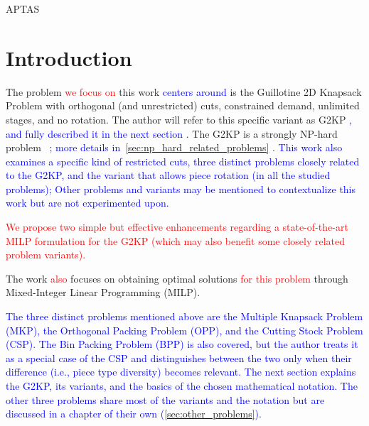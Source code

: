 \documentclass[ppgc,tese,english,formais,babel]{iiufrgs}
\newif\iffinalversion
\newcommand{\newtext}[1]{\iffinalversion%
#1%
\else%
\textcolor{blue}{#1}%
\fi%
}
\newcommand{\oldtext}[1]{\iffinalversion%
\else%
\textcolor{red}{#1}%
\fi%
}
\begin{document}

\listoftables

\begin{listofabbrv}{APTAS}

\end{listofabbrv}


\tableofcontents


\chapter{Introduction}

The problem \oldtext{we focus on} this work \newtext{centers around} is the Guillotine 2D Knapsack Problem with orthogonal (and unrestricted) cuts, constrained demand, unlimited stages, and no rotation.
The author will refer to this specific variant as G2KP\newtext{, and fully described it in the next section}.
The G2KP is a strongly NP-hard problem~\newtext{\citep{korf:initial:2003,dolatabadi:2012}; more details in~\cref{sec:np_hard_related_problems}}.
\newtext{This work also examines a specific kind of restricted cuts, three distinct problems closely related to the G2KP, and the variant that allows piece rotation (in all the studied problems); Other problems and variants may be mentioned to contextualize this work but are not experimented upon.}
\oldtext{We propose two simple but effective enhancements regarding a state-of-the-art MILP formulation for the G2KP (which may also benefit some closely related problem variants).}
The work \oldtext{also} focuses on obtaining optimal solutions \oldtext{for this problem} through Mixed-Integer Linear Programming (MILP).

\newtext{
The three distinct problems mentioned above are the Multiple Knapsack Problem (MKP), the Orthogonal Packing Problem (OPP), and the Cutting Stock Problem (CSP). The Bin Packing Problem (BPP) is also covered, but the author treats it as a special case of the CSP and distinguishes between the two only when their difference (i.e., piece type diversity) becomes relevant.
The next section explains the G2KP, its variants, and the basics of the chosen mathematical notation.
The other three problems share most of the variants and the notation but are discussed in a chapter of their own (\cref{sec:other_problems}).
}
\end{document}
